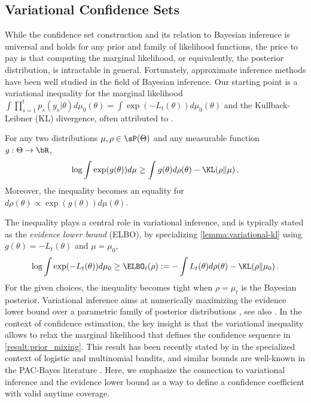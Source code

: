 
\subsection{Variational Confidence Sets}\label{sec:elbo}
While the confidence set construction and its relation to Bayesian inference is universal and holds for any prior and family of likelihood functions, the price to pay is that computing the marginal likelihood, or equivalently, the posterior distribution, is intractable in general. Fortunately, approximate inference methods have been well studied in the field of Bayesian inference. 
Our starting point is a variational inequality for the marginal likelihood $\int \prod_{s=1}^t p_s(y_s|\theta)d\mu_0(\theta) = \int \exp(- L_t(\theta)) d\mu_0(\theta)$ and the Kullback-Leibner (KL) divergence, often attributed to \citet{donsker1983asymptotic}. 
\begin{lemma}\label{lemma:variational-kl}
For any two distributions $\mu,\rho \in \sP(\Theta)$ and any measurable function $g : \Theta \rightarrow \bR$,
    \begin{align*}
    \log \int \exp(g(\theta)) d\mu \geq \int g(\theta) d\rho(\theta) - \KL(\rho\|\mu) \,.
    \end{align*}
    Moreover, the inequality becomes an equality for $d\rho(\theta) \propto \exp(g(\theta)) d\mu(\theta)$.
\end{lemma}
The inequality plays a central role in variational inference, and is typically stated as the \emph{evidence lower bound} (ELBO), by specializing \cref{lemma:variational-kl} using $g(\theta) = - L_t (\theta)$ and $\mu = \mu_0$,
\begin{align*}
 \log \int \exp(- L_t(\theta)) d\mu_0 \geq \ELBO_t(\rho) := -\int L_t(\theta) d\rho(\theta) - \KL(\rho\|\mu_0) \,.
\end{align*}
For the given choices, the inequality becomes tight when $\rho = \mu_t$ is the Bayesian posterior.
Variational inference aims at numerically maximizing the evidence lower bound over a parametric family of posterior distributions \citep{jordan1999introduction}, see also \citep{blei2017variational}. In the context of confidence estimation, the key insight is that the variational inequality allows to relax the marginal likelihood that defines the confidence sequence in \cref{result:prior_mixing}. This result has been recently stated by \citet{lee2024improved} in the specialized context of logistic and multinomial bandits, and similar bounds are well-known in the PAC-Bayes literature \citep[e.g.,][]{zhang2006varepsilon,chen2022unified,alquier2024user}. Here, we emphasize the connection to variational inference and the evidence lower bound as a way to define a confidence coefficient with valid anytime coverage.
